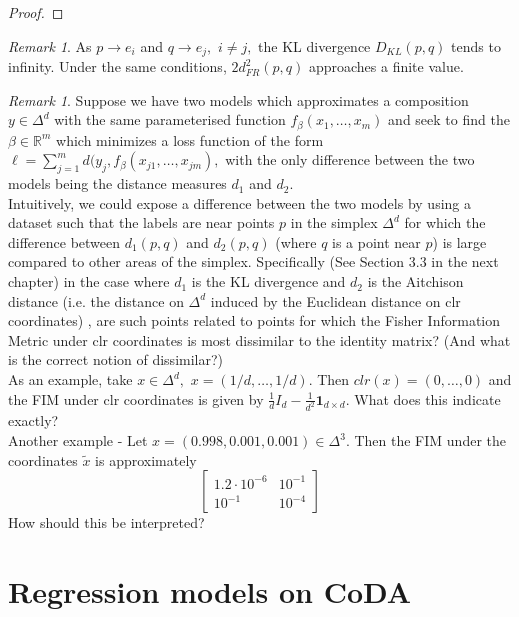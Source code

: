 \documentclass[BSc]{usydthesis}
\numberwithin{equation}{chapter}
\theoremstyle{remark}
\newtheorem{Remark}[equation]{Remark}
\begin{document}
\begin{proof}
\end{proof}

\begin{Remark}
As $p\to e_i$ and $q\to e_j,$ $i\neq j,$ the KL divergence $D_{KL}(p,q)$ tends to infinity. Under the same conditions, $2 d_{FR}^2(p,q)$ approaches a finite value.  
\end{Remark}

\begin{Remark}
Suppose we have two models which approximates a composition $y \in \Delta^d$ with the same parameterised function $f_{\beta}(x_1,\ldots, x_m)$ and seek to find the $\beta\in \mathbb{R}^m$ which minimizes a loss function of the form $\ell  = \sum_{j=1}^m d(y_j, f_{\beta}(x_{j1}, \ldots, x_{jm}),$ with the only difference between the two models being the distance measures $d_1$ and $d_2.$ \
\\

Intuitively, we could expose a difference between the two models by using a dataset such that the labels are near points $p$ in the simplex $\Delta^d$ for which the difference between $d_1(p,q)$ and $d_2(p,q)$ (where $q$ is a point near $p$) is large compared to other areas of the simplex. Specifically (See Section 3.3 in the next chapter) in the case where $d_1$ is the KL divergence and $d_2$ is the Aitchison distance (i.e. the distance on $\Delta^d$ induced by the Euclidean distance on clr coordinates) , are such points related to points for which the Fisher Information Metric under clr coordinates is most dissimilar to the identity matrix? (And what is the correct notion of dissimilar?)    \
\\
As an example, take $x\in \Delta^d,$ $x= (1/d, \ldots, 1/d).$ Then $clr(x) = (0,\ldots, 0)$ and the FIM under clr coordinates is given by $\frac{1}{d} I_d - \frac{1}{d^2} \mathbf{1}_{d\times d}.$ What does this indicate exactly?
\\
Another example - Let $x = (0.998, 0.001, 0.001) \in \Delta^3.$ Then the FIM under the coordinates $\tilde{x}$ is approximately 
$$ \begin{bmatrix}1.2 \cdot 10^{-6} & 10^{-1}\\10^{-1} & 10^{-4} \end{bmatrix} $$
How should this be interpreted?
\end{Remark}


\chapter{Regression models on CoDA}
\end{document}
